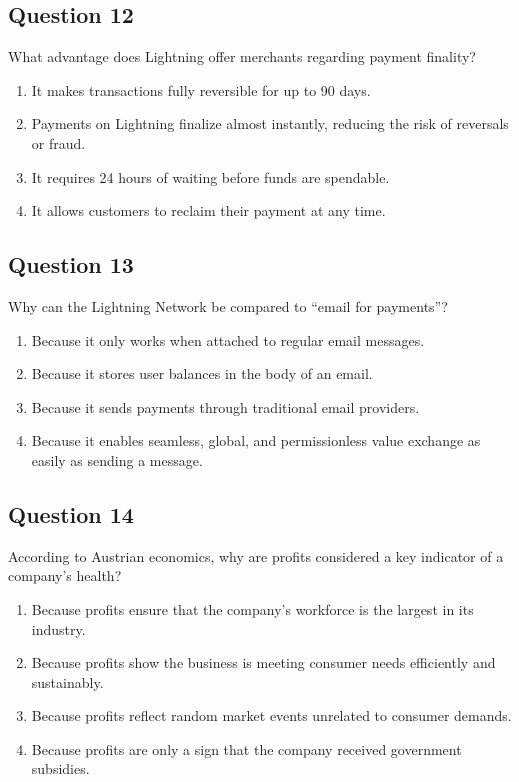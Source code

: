 \documentclass[12pt,a4paper]{article}
\begin{document}
\bigskip


\subsection*{Question 12}
What advantage does Lightning offer merchants regarding payment finality?

\begin{enumerate}[label=\Alph*., leftmargin=*]
\item It makes transactions fully reversible for up to 90 days.
\item Payments on Lightning finalize almost instantly, reducing the risk of reversals or fraud.
\item It requires 24 hours of waiting before funds are spendable.
\item It allows customers to reclaim their payment at any time.
\end{enumerate}

\bigskip


\subsection*{Question 13}
Why can the Lightning Network be compared to “email for payments”?

\begin{enumerate}[label=\Alph*., leftmargin=*]
\item Because it only works when attached to regular email messages.
\item Because it stores user balances in the body of an email.
\item Because it sends payments through traditional email providers.
\item Because it enables seamless, global, and permissionless value exchange as easily as sending a message.
\end{enumerate}

\bigskip


\subsection*{Question 14}
According to Austrian economics, why are profits considered a key indicator of a company's health?

\begin{enumerate}[label=\Alph*., leftmargin=*]
\item Because profits ensure that the company's workforce is the largest in its industry.
\item Because profits show the business is meeting consumer needs efficiently and sustainably.
\item Because profits reflect random market events unrelated to consumer demands.
\item Because profits are only a sign that the company received government subsidies.
\end{enumerate}
\end{document}
